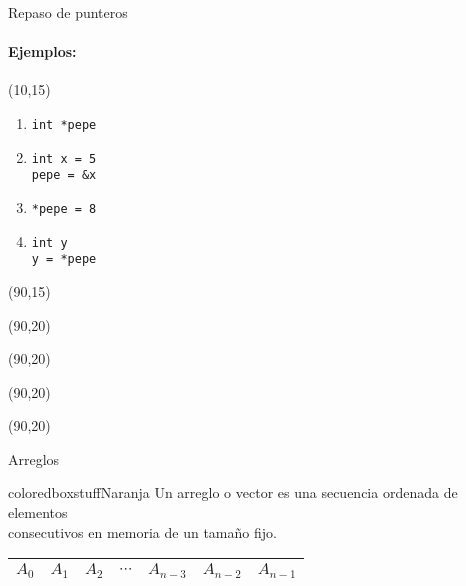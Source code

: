 \documentclass[aspectratio=169]{beamer}
\begin{document}
\begin{frame}[fragile]{Repaso de punteros}
    \framesubtitle{Ejemplos:}
    \begin{textblock}{50}(10,15)
    \begin{enumerate}
    \setlength\itemsep{1.5em}
    \Large
    \item \verb|int *pepe|
    \vskip 0.3cm
    \item \verb|int x = 5|\\
    \verb|pepe = &x|
    \vskip 0.3cm
    \item \verb|*pepe = 8|
    \vskip 0.3cm
    \item \verb|int y|\\
    \verb|y = *pepe|
    \vskip 0.3cm
    \end{enumerate}
    \end{textblock}
    \begin{textblock}{50}(90,15)
    \end{textblock}
    \begin{textblock}{50}(90,20)  \end{textblock}
    \begin{textblock}{50}(90,20)  \end{textblock}
    \begin{textblock}{50}(90,20)  \end{textblock}
    \begin{textblock}{50}(90,20)  \end{textblock}
\end{frame}

\begin{frame}[fragile]{Arreglos}
    \begin{beamercolorbox}[wd=1\textwidth,sep=1em]{coloredboxstuffNaranja}
    \centering \large
    Un arreglo o vector es una secuencia ordenada de elementos\\ consecutivos en memoria de un tamaño fijo.
    \end{beamercolorbox}
    \bigskip
    \begin{center}
    \large
    \begin{tabular}{|c|c|c|c|c|c|c|}
     \hline
     $A_0$ & $A_1$ & $A_2$ & $\cdots$ & $A_{n-3}$ & $A_{n-2}$ & $A_{n-1}$ \\
     \hline
    \end{tabular}
    \end{center}
\end{frame}
\end{document}
